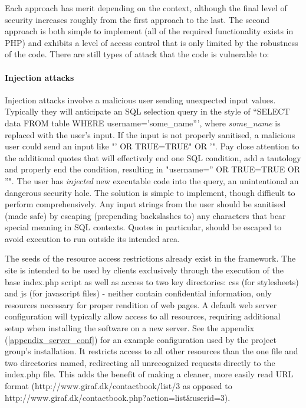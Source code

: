 Each approach has merit depending on the context, although the final level of security increases roughly from the first approach to the last. The second approach is both simple to implement (all of the required functionality exists in PHP) and exhibits a level of access control that is only limited by the robustness of the code. There are still types of attack that the code is vulnerable to:

\paragraph*{Injection attacks}
Injection attacks involve a malicious user sending unexpected input values. Typically they will anticipate an SQL selection query in the style of ``SELECT data FROM table WHERE username='some\_name''', where \emph{some\_name} is replaced with the user's input. If the input is not properly sanitised, a malicious user could send an input like "' OR TRUE=TRUE" OR '". Pay close attention to the additional quotes that will effectively end one SQL condition, add a tautology and properly end the condition, resulting in "username='' OR TRUE=TRUE OR ''". The user has \emph{injected} new executable code into the query, an unintentional an dangerous security hole. The solution is simple to implement, though difficult to perform comprehensively. Any input strings from the user should be sanitised (made safe) by escaping (prepending backslashes to) any characters that bear special meaning in SQL contexts. Quotes in particular, should be escaped to avoid execution to run outside its intended area.

The seeds of the resource access restrictions already exist in the framework. The site is intended to be used by clients exclusively through the execution of the base index.php script as well as access to two key directories: css (for stylesheets) and js (for javascript files) - neither contain confidential information, only resources necessary for proper rendition of web pages. A default web server configuration will typically allow access to all resources, requiring additional setup when installing the software on a new server. See the appendix (\vref{appendix_server_conf}) for an example configuration used by the project group's installation. It restricts access to all other resources than the one file and two directories named, redirecting all unrecognized requests directly to the index.php file. This adds the benefit of making a cleaner, more easily read URL format (http://www.giraf.dk/contactbook/list/3 as opposed to http://www.giraf.dk/contactbook.php?action=list\&userid=3).

